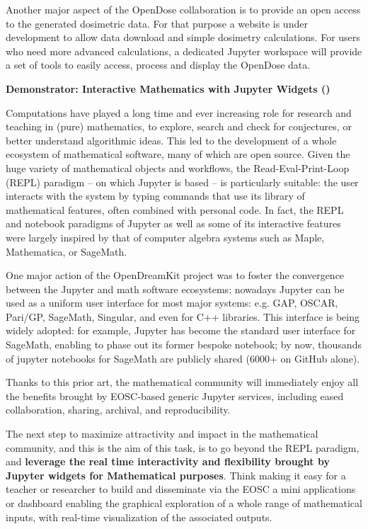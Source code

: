   Another major aspect of the OpenDose collaboration is to provide an open
  access to the generated dosimetric data. For that purpose a website is under
  development to allow data download and simple dosimetry calculations. For
  users who need more advanced calculations, a dedicated Jupyter workspace will
  provide a set of tools to easily access, process and display the OpenDose
  data.

\medskip
\textbf{Demonstrator: Interactive Mathematics with Jupyter Widgets ()}\label{sec:concept-demonstrator-math}


  Computations have played a long time and ever increasing role for
  research and teaching in (pure) mathematics, to explore, search and
  check for conjectures, or better understand algorithmic ideas. This
  led to the development of a whole ecosystem of mathematical
  software, many of which are open source. Given the huge variety of
  mathematical objects and workflows, the Read-Eval-Print-Loop (REPL)
  paradigm -- on which Jupyter is based -- is particularly suitable:
  the user interacts with the system by typing commands that use its
  library of mathematical features, often combined with personal code.
  In fact, the REPL and notebook paradigms of Jupyter as well as some
  of its interactive features were largely inspired by that of
  computer algebra systems such as Maple, Mathematica, or SageMath.

  One major action of the OpenDreamKit project was to foster the
  convergence between the Jupyter and math software ecosystems:
  nowadays Jupyter can be used as a uniform user interface for most
  major systems: e.g. GAP, OSCAR, Pari/GP, SageMath, Singular, and
  even for C++ libraries. This interface is being widely adopted: for
  example, Jupyter has become the standard user interface for
  SageMath, enabling to phase out its former bespoke notebook; by now,
  thousands of jupyter notebooks for SageMath are publicly shared
  (6000+ on GitHub alone).

  Thanks to this prior art, the mathematical community will
  immediately enjoy all the benefits brought by EOSC-based generic
  Jupyter services, including eased collaboration, sharing, archival,
  and reproducibility.

  The next step to maximize attractivity and impact in the
  mathematical community, and this is the aim of this task, is to go
  beyond the REPL paradigm, and \textbf{leverage the real time
    interactivity and flexibility brought by Jupyter widgets for
    Mathematical purposes}. Think making it easy for a teacher or
  researcher to build and disseminate via the EOSC a mini applications
  or dashboard enabling the graphical exploration of a whole range of
  mathematical inputs, with real-time visualization of the associated
  outputs.

